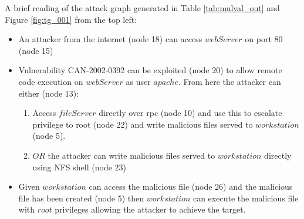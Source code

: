 
 A brief reading of the attack graph generated in Table \ref{tab:mulval_out} and Figure \ref{fig:tg_001} from the top left:
\begin{itemize}
\item An attacker from the internet (node 18) can access $webServer$ on port 80 (node 15)
\item Vulnerability CAN-2002-0392 can be exploited (node 20) to allow remote code execution on $webServer$ as user $apache$. From here the attacker can either (node 13):
\begin{enumerate}
\item Access $fileServer$ directly over rpc (node 10) and use this to escalate privilege to root (node 22) and write malicious files served to $workstation$ (node 5). 
\item $OR$ the attacker can write malicious files served to $workstation$ directly using NFS shell (node 23) 
\end{enumerate}
\item Given $workstation$ can access the malicious file (node 26) and the malicious file has been created (node 5) then $workstation$ can execute the malicious file with $root$ privileges allowing the attacker to achieve the target. 
\end{itemize}

